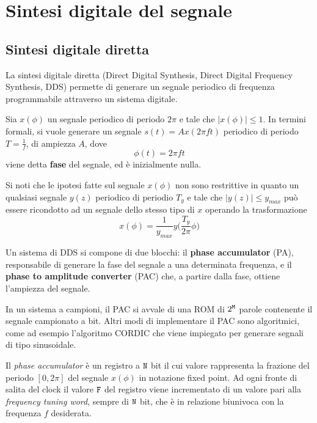 \DeclarePairedDelimiter\floor{\lfloor}{\rfloor}

\chapter{Sintesi digitale del segnale}
\section{Sintesi digitale diretta}
La sintesi digitale diretta (Direct Digital Synthesis, Direct Digital Frequency Synthesis, DDS) permette di generare un segnale periodico di frequenza programmabile attraverso un sistema digitale.

Sia $x(\phi)$ un segnale periodico di periodo $2\pi$ e tale che $|x(\phi)| \le 1$.
In termini formali, si vuole generare un segnale $s(t)=Ax(2\pi ft)$ periodico di periodo $T=\frac{1}{f}$, di ampiezza $A$, dove
\begin{equation}
\label{eq:phase}
\phi(t) = 2\pi f t
\end{equation}
viene detta \textbf{fase} del segnale, ed è inizialmente nulla.

Si noti che le ipotesi fatte sul segnale $x(\phi)$ non sono restrittive in quanto
un qualsiasi segnale $y(z)$ periodico di periodio $T_y$ e tale che $|y(z)| \le y_{max}$ può
essere ricondotto ad un segnale dello stesso tipo di $x$ operando la trasformazione
\[
x(\phi)=\frac{1}{y_{max}}y \Big ( \frac{T_y}{2\pi}\phi \Big )
\]

Un sistema di DDS si compone di due blocchi: il \textbf{phase accumulator} (PA), responsabile di generare la fase del segnale a una determinata frequenza, e il \textbf{phase to amplitude converter} (PAC) che, a partire dalla fase, ottiene l'ampiezza del segnale.

In un sistema a campioni, il PAC si avvale di una ROM di $2^{\texttt{M}}$ parole contenente il segnale campionato a  bit.
Altri modi di implementare il PAC sono algoritmici, come ad esempio l'algoritmo CORDIC
che viene impiegato per generare segnali di tipo sinusoidale.

Il \textit{phase accumulator} è un registro a $\texttt{N}$ bit il cui valore rappresenta la frazione del periodo $[0, 2\pi]$ del segnale
$x(\phi)$ in notazione
fixed point. Ad ogni fronte di salita del clock il valore $\texttt{F}$ del registro viene incrementato di un valore pari alla \textit{frequency tuning word},
sempre di $\texttt{N}$ bit, che è in relazione biunivoca con la frequenza $f$ desiderata.

